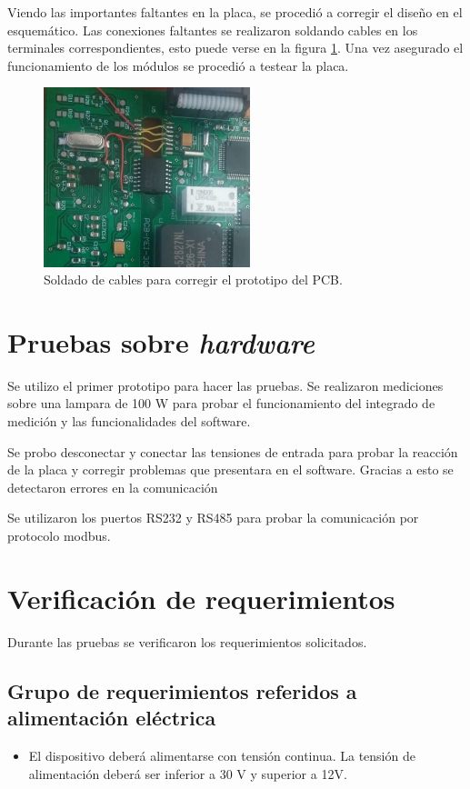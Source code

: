 Viendo las importantes faltantes en la placa, se procedió a corregir el diseño en el esquemático. Las conexiones faltantes se realizaron soldando cables en los terminales correspondientes, esto puede verse en la figura \ref{fig:parchess2}. Una vez asegurado el funcionamiento de los módulos se procedió a testear la placa.

\begin{figure}[!htb]
	\centering
	\includegraphics[width=60mm,keepaspectratio]{Figures/parche2.jpg}
	\caption{Soldado de cables para corregir el prototipo del PCB.}
	\label{fig:parchess2}
\end{figure}

\section{Pruebas sobre \textit{hardware}}
\label{sec:pruebasHW}

Se utilizo el primer prototipo para hacer las pruebas. Se realizaron mediciones sobre una lampara de 100 W para probar el funcionamiento del integrado de medición y las funcionalidades del software.

Se probo desconectar y conectar las tensiones de entrada para probar la reacción de la placa y corregir problemas que presentara en el software. Gracias a esto se detectaron errores en la comunicación 

Se utilizaron los puertos RS232 y RS485 para probar la comunicación por protocolo modbus.

\section{ Verificación de requerimientos}

Durante las pruebas se verificaron los requerimientos solicitados.

\subsection{Grupo de requerimientos referidos a alimentación eléctrica}
\begin{itemize}
\item El dispositivo deberá alimentarse con tensión continua. La tensión de alimentación deberá ser inferior a 30 V y superior a 12V.
\end{itemize}

